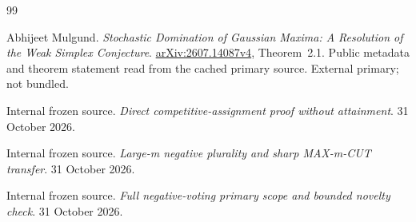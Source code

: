 \begin{thebibliography}{99}
\par{}

\par{}


Abhijeet Mulgund. \emph{Stochastic Domination of Gaussian Maxima: A Resolution of the Weak Simplex Conjecture}. \href{https://arxiv.org/html/2607.14087v4}{arXiv:2607.14087v4}, Theorem~2.1. Public metadata and theorem statement read from the cached primary source. External primary; not bundled.

\par{}

\par{}



Internal frozen source. \emph{Direct competitive-assignment proof without attainment}. 31 October 2026.

\par{}

\par{}


Internal frozen source. \emph{Large-m negative plurality and sharp MAX-m-CUT transfer}. 31 October 2026.

\par{}

\par{}


Internal frozen source. \emph{Full negative-voting primary scope and bounded novelty check}. 31 October 2026.

\par{}


\end{thebibliography}
